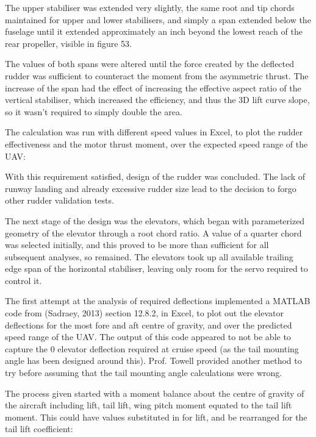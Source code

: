 \documentclass[../../main.tex]{subfiles}
\begin{document}
The upper stabiliser was extended very slightly, the same root and tip chords maintained for upper and lower stabilisers, and simply a span extended below the fuselage until it extended approximately an inch beyond the lowest reach of the rear propeller, visible in figure 53. 

The values of both spans were altered until the force created by the deflected rudder was sufficient to counteract the moment from the asymmetric thrust.
The increase of the span had the effect of increasing the effective aspect ratio of the vertical stabiliser, which increased the efficiency, and thus the 3D lift curve slope, so it wasn’t required to simply double the area. 

The calculation was run with different speed values in Excel, to plot the rudder effectiveness and the motor thrust moment, over the expected speed range of the UAV: 


With this requirement satisfied, design of the rudder was concluded.
The lack of runway landing and already excessive rudder size lead to the decision to forgo other rudder validation tests. 

The next stage of the design was the elevators, which began with parameterized geometry of the elevator through a root chord ratio.
A value of a quarter chord was selected initially, and this proved to be more than sufficient for all subsequent analyses, so remained.
The elevators took up all available trailing edge span of the horizontal stabiliser, leaving only room for the servo required to control it.  

The first attempt at the analysis of required deflections implemented a MATLAB code from (Sadraey, 2013) section 12.8.2, in Excel, to plot out the elevator deflections for the most fore and aft centre of gravity, and over the predicted speed range of the UAV.
The output of this code appeared to not be able to capture the 0 elevator deflection required at cruise speed (as the tail mounting angle has been designed around this).
Prof. Towell provided another method to try before assuming that the tail mounting angle calculations were wrong.  

The process given started with a moment balance about the centre of gravity of the aircraft including lift, tail lift, wing pitch moment equated to the tail lift moment.
This could have values substituted in for lift, and be rearranged for the tail lift coefficient: 
\end{document}
